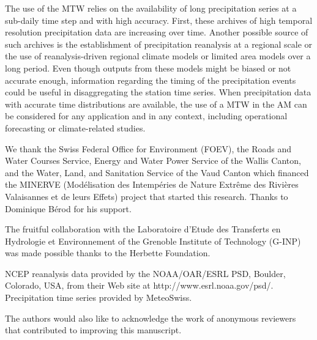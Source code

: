 \documentclass[hess, manuscript]{copernicus}
\begin{document}
	The use of the MTW relies on the availability of long precipitation series at a sub-daily time step and with high accuracy. First, these archives of high temporal resolution precipitation data are increasing over time. Another possible source of such archives is the establishment of precipitation reanalysis at a regional scale or the use of reanalysis-driven regional climate models or limited area models over a long period. Even though outputs from these models might be biased or not accurate enough, information regarding the timing of the precipitation events could be useful in disaggregating the station time series. When precipitation data with accurate time distributions are available, the use of a MTW in the AM can be considered for any application and in any context, including operational forecasting or climate-related studies.
	
	
	
	\begin{acknowledgements}
		We thank the Swiss Federal Office for Environment (FOEV), the Roads and Water Courses Service, Energy and Water Power Service of the Wallis Canton, and the Water, Land, and Sanitation Service of the Vaud Canton which financed the MINERVE (Mod\'{e}lisation des Intemp\'{e}ries de Nature Extr\^{e}me des Rivi\`{e}res Valaisannes et de leurs Effets) project that started this research. Thanks to Dominique B\'{e}rod for his support.
		
		The fruitful collaboration with the Laboratoire d'Etude des Transferts en Hydrologie et Environnement of the Grenoble Institute of Technology (G-INP) was made possible thanks to the Herbette Foundation. 
		
		NCEP reanalysis data provided by the NOAA/OAR/ESRL PSD, Boulder, Colorado, USA, from their Web site at http://www.esrl.noaa.gov/psd/. Precipitation time series provided by MeteoSwiss.
		
		The authors would also like to acknowledge the work of anonymous reviewers that contributed to improving this manuscript. 
	\end{acknowledgements}
	
	
	
	
	
	
	
	
	
\end{document}
